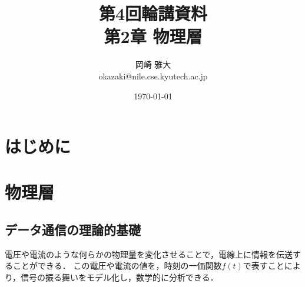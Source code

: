 \documentclass[a4paper]{ltjsarticle}
\title{第4回輪講資料 \\ 第2章 物理層}
\author{岡崎 雅大 \\ okazaki@nile.cse.kyutech.ac.jp}
\date{\today}
\begin{document}
\maketitle
\tableofcontents

\section{はじめに}

\section{物理層}
	\subsection{データ通信の理論的基礎}
		電圧や電流のような何らかの物理量を変化させることで，電線上に情報を伝送することができる．
		この電圧や電流の値を，時刻の一価関数$f(t)$で表すことにより，信号の振る舞いをモデル化し，数学的に分析できる．
\end{document}

